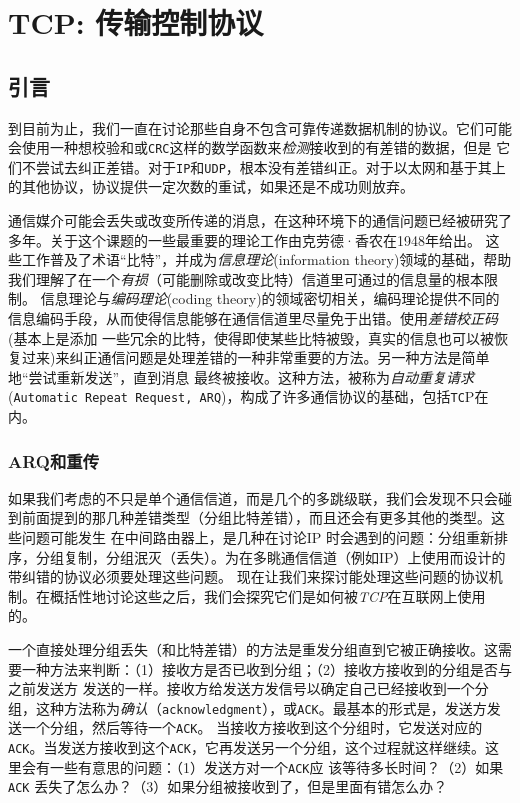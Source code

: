 \chapter{TCP: 传输控制协议}

\section{引言}
到目前为止，我们一直在讨论那些自身不包含可靠传递数据机制的协议。它们可能会使用一种想校验和或\verb|CRC|这样的数学函数来\emph{检测}接收到的有差错的数据，但是
它们不尝试去纠正差错。对于\verb|IP|和\verb|UDP|，根本没有差错纠正。对于以太网和基于其上的其他协议，协议提供一定次数的重试，如果还是不成功则放弃。

通信媒介可能会丢失或改变所传递的消息，在这种环境下的通信问题已经被研究了多年。关于这个课题的一些最重要的理论工作由克劳德·香农在1948年给出。
这些工作普及了术语“比特”，并成为\emph{信息理论}(information theory)领域的基础，帮助我们理解了在一个\emph{有损}（可能删除或改变比特）信道里可通过的信息量的根本限制。
信息理论与\emph{编码理论}(coding theory)的领域密切相关，编码理论提供不同的信息编码手段，从而使得信息能够在通信信道里尽量免于出错。使用\emph{差错校正码}(基本上是添加
一些冗余的比特，使得即使某些比特被毁，真实的信息也可以被恢复过来)来纠正通信问题是处理差错的一种非常重要的方法。另一种方法是简单地“尝试重新发送”，直到消息
最终被接收。这种方法，被称为\emph{自动重复请求} (\verb|Automatic Repeat Request, ARQ|)，构成了许多通信协议的基础，包括\verb|TC|P在内。
\subsection{ARQ和重传}
如果我们考虑的不只是单个通信信道，而是几个的多跳级联，我们会发现不只会碰到前面提到的那几种差错类型（分组比特差错），而且还会有更多其他的类型。这些问题可能发生
在中间路由器上，是几种在讨论IP 时会遇到的问题：分组重新排序，分组复制，分组泯灭（丢失）。为在多眺通信信道（例如IP）上使用而设计的带纠错的协议必须要处理这些问题。
现在让我们来探讨能处理这些问题的协议机制。在概括性地讨论这些之后，我们会探究它们是如何被\emph{TCP}在互联网上使用的。

一个直接处理分组丢失（和比特差错）的方法是重发分组直到它被正确接收。这需要一种方法来判断：（1）接收方是否已收到分组；（2）接收方接收到的分组是否与之前发送方
发送的一样。接收方给发送方发信号以确定自己已经接收到一个分组，这种方法称为\emph{确认}（\verb|acknowledgment|），或\verb|ACK|。最基本的形式是，发送方发送一个分组，然后等待一个\verb|ACK|。
当接收方接收到这个分组时，它发送对应的\verb|ACK|。当发送方接收到这个\verb|ACK|，它再发送另一个分组，这个过程就这样继续。这里会有一些有意思的问题：（1）发送方对一个\verb|ACK|应
该等待多长时间？（2）如果 \verb|ACK| 丢失了怎么办？（3）如果分组被接收到了，但是里面有错怎么办？

